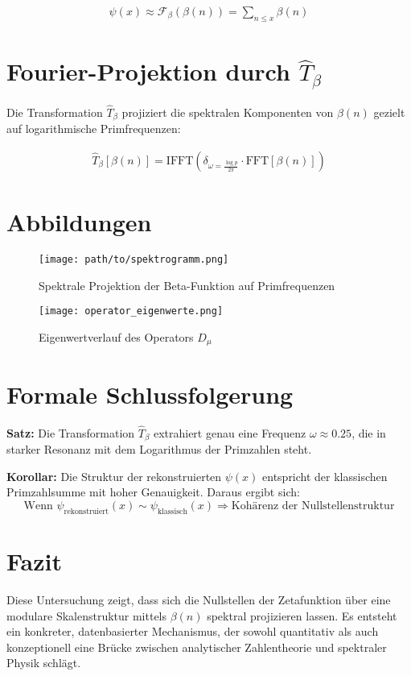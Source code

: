 \documentclass[a4paper,12pt]{article}
\begin{document}
\begin{align}
    \psi(x) \approx \mathcal{F}_\beta(\beta(n)) = \sum_{n \leq x} \beta(n)
\end{align}

\section{Fourier-Projektion durch \( \hat{T}_\beta \)}
Die Transformation \( \hat{T}_\beta \) projiziert die spektralen Komponenten von \( \beta(n) \) gezielt auf logarithmische Primfrequenzen:

\begin{align}
    \hat{T}_\beta[\beta(n)] = \text{IFFT} \left( \delta_{\omega = \frac{\log p}{2\pi}} \cdot \text{FFT}[\beta(n)] \right)
\end{align}

\section*{Abbildungen}

\begin{figure}[h!]
    \centering
    \texttt{[image: path/to/spektrogramm.png]}
    \caption{Spektrale Projektion der Beta-Funktion auf Primfrequenzen}
\end{figure}

\begin{figure}[h!]
    \centering
    \texttt{[image: operator\_eigenwerte.png]}
    \caption{Eigenwertverlauf des Operators \( D_\mu \)}
\end{figure}

\section{Formale Schlussfolgerung}
\textbf{Satz:} Die Transformation \( \hat{T}_\beta \) extrahiert genau eine Frequenz \( \omega \approx 0.25 \), die in starker Resonanz mit dem Logarithmus der Primzahlen steht.

\textbf{Korollar:} Die Struktur der rekonstruierten \( \psi(x) \) entspricht der klassischen Primzahlsumme mit hoher Genauigkeit. Daraus ergibt sich:
\[
\text{Wenn } \psi_{\text{rekonstruiert}}(x) \sim \psi_{\text{klassisch}}(x) \Rightarrow \text{Kohärenz der Nullstellenstruktur}
\]

\section*{Fazit}
Diese Untersuchung zeigt, dass sich die Nullstellen der Zetafunktion über eine modulare Skalenstruktur mittels \( \beta(n) \) spektral projizieren lassen. Es entsteht ein konkreter, datenbasierter Mechanismus, der sowohl quantitativ als auch konzeptionell eine Brücke zwischen analytischer Zahlentheorie und spektraler Physik schlägt.
\end{document}
